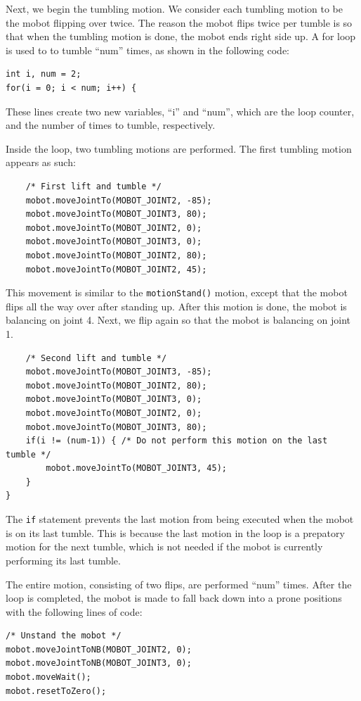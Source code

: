 \documentclass{article}
\begin{document}
Next, we begin the tumbling motion. We consider each tumbling motion to be the 
mobot flipping over twice. The reason the mobot flips twice per tumble is so that
when the tumbling motion is done, the mobot ends right side up. 
A for loop is used to to tumble ``num'' times, as shown in the following code:
\begin{verbatim}
int i, num = 2;
for(i = 0; i < num; i++) {
\end{verbatim}
These lines create two new variables, ``i'' and ``num'', which are the loop
counter, and the number of times to tumble, respectively. 

Inside the loop, two tumbling motions are performed. The first tumbling
motion appears as such:
\begin{verbatim}
    /* First lift and tumble */
    mobot.moveJointTo(MOBOT_JOINT2, -85);
    mobot.moveJointTo(MOBOT_JOINT3, 80);
    mobot.moveJointTo(MOBOT_JOINT2, 0);
    mobot.moveJointTo(MOBOT_JOINT3, 0);
    mobot.moveJointTo(MOBOT_JOINT2, 80);
    mobot.moveJointTo(MOBOT_JOINT2, 45);
\end{verbatim}
This movement is similar to the \texttt{motionStand()} motion, except that the
mobot flips all the way over after standing up. After this motion is done,
the mobot is balancing on joint 4. Next, we flip again so that the mobot
is balancing on joint 1.
\begin{verbatim}
    /* Second lift and tumble */
    mobot.moveJointTo(MOBOT_JOINT3, -85);
    mobot.moveJointTo(MOBOT_JOINT2, 80);
    mobot.moveJointTo(MOBOT_JOINT3, 0);
    mobot.moveJointTo(MOBOT_JOINT2, 0);
    mobot.moveJointTo(MOBOT_JOINT3, 80);
    if(i != (num-1)) { /* Do not perform this motion on the last tumble */
        mobot.moveJointTo(MOBOT_JOINT3, 45);
    }
}
\end{verbatim}
The \texttt{if} statement prevents the last motion from being executed
when the mobot is on its last tumble. This is because the last motion in the
loop is a prepatory motion for the next tumble, which is not needed if the
mobot is currently performing its last tumble. 

The entire motion, consisting of two flips, are performed ``num'' times. After
the loop is completed, the mobot is made to fall back down into a prone
positions with the following lines of code:
\begin{verbatim}
/* Unstand the mobot */
mobot.moveJointToNB(MOBOT_JOINT2, 0);
mobot.moveJointToNB(MOBOT_JOINT3, 0);
mobot.moveWait();
mobot.resetToZero();
\end{verbatim}
\end{document}
